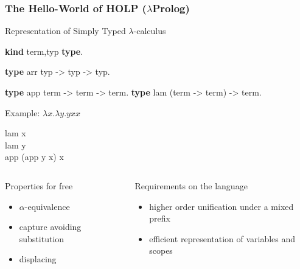 \documentclass{beamer}
\begin{document}
\begin{frame}[fragile]
 \frametitle{The Hello-World of HOLP ($\lambda$Prolog)}
 \begin{block}{Representation of Simply Typed $\lambda$-calculus}
{\small \begin{semiverbatim}
\textbf{kind} term,typ \textbf{type}. 

\textbf{type} arr typ -> typ -> typ.

\textbf{type} app term -> term -> term.
\textbf{type} lam (term -> term) -> term.
\end{semiverbatim}}
 \end{block}

\begin{block}{Example: $\lambda x. \lambda y. y x x$}
\begin{semiverbatim}
lam x \\ lam y \\ app (app y x) x
\end{semiverbatim}
\end{block}
 
 \vspace{-0.5cm}
 \begin{columns}[t]
 \begin{block}{Properties for free}
  \begin{itemize}
   \item $\alpha$-equivalence
   \item capture avoiding substitution
   \item displacing
  \end{itemize}
 \end{block}
 \begin{block}{Requirements on the language}
   \begin{itemize}
    \item higher order unification under a mixed prefix
    \item efficient representation of variables and
      scopes
   \end{itemize}
 \end{block}
  \end{columns}
\end{frame}
\end{document}
